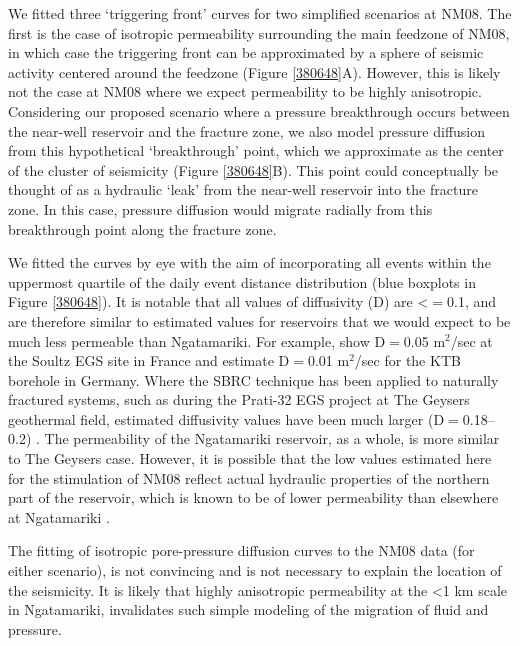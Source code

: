 We fitted three `triggering front' curves for two simplified scenarios at NM08. The first is the case of isotropic \gls{permeability} surrounding the main \gls{feedzone} of NM08, in which case the triggering front can be approximated by a sphere of seismic activity centered around the \gls{feedzone} (Figure \ref{380648}A). However, this is likely not the case at NM08 where we expect \gls{permeability} to be highly anisotropic. Considering our proposed scenario where a pressure breakthrough occurs between the near-well reservoir and the fracture zone, we also model pressure diffusion from this hypothetical `breakthrough' point, which we approximate as the center of the cluster of seismicity (Figure \ref{380648}B). This point could conceptually be thought of as a hydraulic `leak' from the near-well reservoir into the fracture zone. In this case, pressure diffusion would migrate radially from this breakthrough point along the fracture zone.

We fitted the curves by eye with the aim of incorporating all events within the uppermost quartile of the daily event distance distribution (blue boxplots in Figure \ref{380648}). It is notable that all values of \gls{diffusivity} (D) are \textless$=$0.1, and are therefore similar to estimated values for reservoirs that we would expect to be much less permeable than Ngatamariki. For example, \citet{Shapiro_2002} show D$=$0.05 m$^2$/sec at the Soultz EGS site in France and \citet{Shapiro_2006} estimate D$=$0.01 m$^2$/sec for the KTB borehole in Germany. Where the SBRC technique has been applied to naturally fractured systems, such as during the Prati-32 EGS project at The Geysers geothermal field, estimated \gls{diffusivity} values have been much larger (D$=$0.18--0.2) \citep{Jeanne_2014}. The \gls{permeability} of the Ngatamariki reservoir, as a whole, is more similar to The Geysers case. However, it is possible that the low values estimated here for the \gls{stimulation} of NM08 reflect actual hydraulic properties of the northern part of the reservoir, which is known to be of lower \gls{permeability} than elsewhere at Ngatamariki \citep{Chambefort_2014}.

The fitting of isotropic pore-pressure diffusion curves to the NM08 data (for either scenario), is not convincing and is not necessary to explain the location of the seismicity. It is likely that highly anisotropic \gls{permeability} at the \textless1 km scale in Ngatamariki, invalidates such simple modeling of the migration of fluid and pressure.

